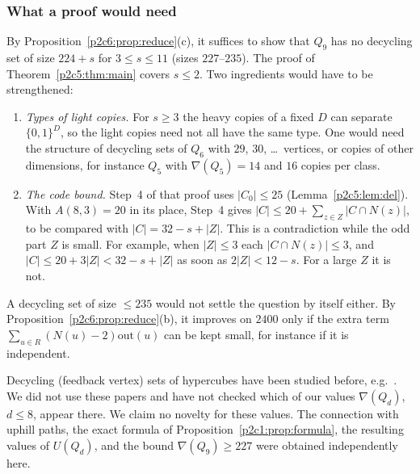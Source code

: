 \subsubsection{What a proof would need}

By Proposition~\ref{p2c6:prop:reduce}(c), it suffices to show that $Q_9$ has no decycling set of
size $224+s$ for $3\le s\le11$ (sizes $227$--$235$). The proof of Theorem~\ref{p2c5:thm:main}
covers $s\le2$. Two ingredients would have to be strengthened:
\begin{enumerate}[label=(\roman*)]
\item \emph{Types of light copies.} For $s\ge3$ the heavy copies of a fixed $D$ can separate
  $\{0,1\}^D$, so the light copies need not all have the same type. One would need the structure of
  decycling sets of $Q_6$ with $29$, $30$, \dots\ vertices, or copies of other dimensions, for
  instance $Q_5$ with $\nabla(Q_5)=14$ and $16$ copies per class.
\item \emph{The code bound.} Step~4 of that proof uses $|C_0|\le25$ (Lemma~\ref{p2c5:lem:del}). With
  $A(8,3)=20$ in its place, Step~4 gives $|C|\le20+\sum_{z\in Z}|C\cap N(z)|$, to be compared with
  $|C|=32-s+|Z|$. This is a contradiction while the odd part $Z$ is small. For example, when
  $|Z|\le3$ each $|C\cap N(z)|\le3$, and $|C|\le20+3|Z|<32-s+|Z|$ as soon as $2|Z|<12-s$. For a
  large $Z$ it is not.
\end{enumerate}
A decycling set of size $\le235$ would not settle the question by itself either. By
Proposition~\ref{p2c6:prop:reduce}(b), it improves on $2400$ only if the extra term
$\sum_{u\in R}(N(u)-2)\mathrm{out}(u)$ can be kept small, for instance if it is independent.

\begin{remark}[Literature]
Decycling (feedback vertex) sets of hypercubes have been studied before, e.g.\
\cite{FLP00,BB02,Pik03}. We did not use these papers and have not checked which of our values
$\nabla(Q_d)$, $d\le8$, appear there. We claim no novelty for these values. The connection with
uphill paths, the exact formula of Proposition~\ref{p2c1:prop:formula}, the resulting values of
$U(Q_d)$, and the bound $\nabla(Q_9)\ge227$ were obtained independently here.
\end{remark}

